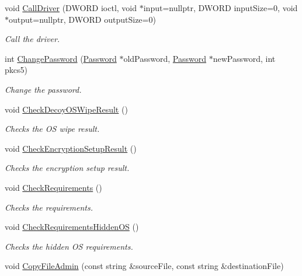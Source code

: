 \begin{DoxyCompactItemize}
void \hyperlink{class_gost_crypt_1_1_boot_encryption_a7f8882a862c69d803f2af4d021329e97}{Call\+Driver} (D\+W\+O\+RD ioctl, void $\ast$input=nullptr, D\+W\+O\+RD input\+Size=0, void $\ast$output=nullptr, D\+W\+O\+RD output\+Size=0)
\begin{DoxyCompactList}\small\item\em Call the driver. \end{DoxyCompactList}\item 
int \hyperlink{class_gost_crypt_1_1_boot_encryption_a9cce66955923f808f4dd297c7041ac5b}{Change\+Password} (\hyperlink{struct_password}{Password} $\ast$old\+Password, \hyperlink{struct_password}{Password} $\ast$new\+Password, int pkcs5)
\begin{DoxyCompactList}\small\item\em Change the password. \end{DoxyCompactList}\item 
void \hyperlink{class_gost_crypt_1_1_boot_encryption_aa730c1ebbc354863f3e32b2ff38a16dc}{Check\+Decoy\+O\+S\+Wipe\+Result} ()
\begin{DoxyCompactList}\small\item\em Checks the OS wipe result. \end{DoxyCompactList}\item 
void \hyperlink{class_gost_crypt_1_1_boot_encryption_ac584bf7946ae3ac2d35fb38fcfbb615a}{Check\+Encryption\+Setup\+Result} ()
\begin{DoxyCompactList}\small\item\em Checks the encryption setup result. \end{DoxyCompactList}\item 
void \hyperlink{class_gost_crypt_1_1_boot_encryption_a1c573946faa2ec5b1bcbeae56d8320f9}{Check\+Requirements} ()
\begin{DoxyCompactList}\small\item\em Checks the requirements. \end{DoxyCompactList}\item 
void \hyperlink{class_gost_crypt_1_1_boot_encryption_af8f44624d785fff7ce9e8078d71f03a6}{Check\+Requirements\+Hidden\+OS} ()
\begin{DoxyCompactList}\small\item\em Checks the hidden OS requirements. \end{DoxyCompactList}\item 
void \hyperlink{class_gost_crypt_1_1_boot_encryption_af19de97081ce528cd89df39393469b7c}{Copy\+File\+Admin} (const string \&source\+File, const string \&destination\+File)

\end{DoxyCompactItemize}
